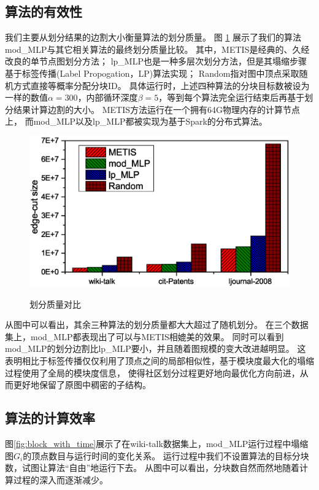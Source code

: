 \documentclass[master]{njuthesis}
\begin{document}
\subsection{算法的有效性}
我们主要从划分结果的边割大小衡量算法的划分质量。
图 \ref{fig:partitionquality} 展示了我们的算法mod\string_MLP与其它相关算法的最终划分质量比较。
其中，METIS\cite{Karypis95metis}是经典的、久经改良的单节点图划分方法；
lp\string_MLP\cite{DBLP:conf/icde/WangXSW14}也是一种多层次划分方法，但是其塌缩步骤基于标签传播\cite{raghavan2007near}(Label Propogation，LP)算法实现；
Random指对图中顶点采取随机方式直接等概率分配分块ID。
具体运行时，上述四种算法的分块目标数被设为一样的数值$\alpha=300$，内部循环深度$\beta=5$，等到每个算法完全运行结束后再基于划分结果计算边割的大小。
METIS方法运行在一个拥有64G物理内存的计算节点上，
而mod\string_MLP以及lp\string_MLP都被实现为基于Spark的分布式算法。
\begin{figure}[h]
  \centering
  \includegraphics[width= 1\textwidth]{figure/p_quality.eps}\\
  \caption{划分质量对比}
   \label{fig:partitionquality}
\end{figure}

从图中可以看出，其余三种算法的划分质量都大大超过了随机划分。
在三个数据集上，mod\string_MLP都表现出了可以与METIS相媲美的效果。
同时可以看到mod\string_MLP的划分边割比lp\string_MLP要小，并且随着图规模的变大改进越明显。
这表明相比于标签传播仅仅利用了顶点之间的局部相似性，基于模块度最大化的塌缩过程使用了全局的模块度信息，
使得社区划分过程更好地向最优化方向前进，从而更好地保留了原图中稠密的子结构。
\subsection{算法的计算效率}
图\ref{fig:block_with_time}展示了在wiki-talk数据集上，mod\string_MLP运行过程中塌缩图$G_i$的顶点数目与运行时间的变化关系。
运行过程中我们不设置算法的目标分块数，试图让算法“自由”地运行下去。
从图中可以看出，分块数自然而然地随着计算过程的深入而逐渐减少。
\end{document}
